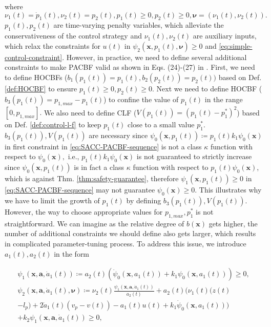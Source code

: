 where $\nu_{1}(t)=\dot{p}_{1}(t),\nu_{2}(t)=p_{2}(t), p_{1}(t)\ge0,p_{2}(t)\ge0,\boldsymbol{\nu}=(\nu_{1}(t),\nu_{2}(t)).$ $p_{1}(t),p_{2}(t)$ are time-varying penalty variables, which alleviate the conservativeness of the control strategy and $\nu_{1}(t),\nu_{2}(t)$ are auxiliary inputs, which relax the constraints for $u(t)$ in $\psi_{2}(\boldsymbol{x},p_{1}(t),\boldsymbol{\nu})\ge0$ and \eqref{eq:simple-control-constraint}. However, in practice, we need to define several additional constraints to make PACBF valid as shown in Eqs. (24)-(27) in \cite{xiao2021adaptive}. First, we need to define HOCBFs ($b_{1}(p_{1}(t))=p_{1}(t),b_{2}(p_{2}(t))=p_{2}(t))$ based on Def. \ref{def:HOCBF} to ensure $p_{1}(t)\ge0,p_{2}(t)\ge0.$ Next we need to define HOCBF ($b_{3}(p_{1}(t))=p_{1,max}-p_{1}(t)$) to confine the value of $p_{1}(t)$ in the range $[0,p_{1,max}].$ We also need to define CLF ($V(p_{1}(t))=(p_{1}(t)-p_{1}^{\ast})^{2}$) based on Def. \ref{def:control-l-f} to keep $p_{1}(t)$ close to a small value $p_{1}^{\ast}.$ $b_{3}(p_{1}(t)), V(p_{1}(t))$ are necessary since $\psi_{0}(\boldsymbol{x},p_{1}(t))\coloneqq p_{1}(t)k_{1}\psi_{0}(\boldsymbol{x})$ in first constraint in \eqref{eq:SACC-PACBF-sequence} is not a class $\kappa$ function with respect to $\psi_{0}(\boldsymbol{x}),$ i.e., $p_{1}(t)k_{1}\psi_{0}(\boldsymbol{x})$ is not guaranteed to strictly increase since $\psi_{0}(\boldsymbol{x},p_{1}(t))$ is in fact a class $\kappa$ function with respect to $p_{1}(t)\psi_{0}(\boldsymbol{x})$, which is against Thm. \ref{thm:safety-guarantee}, therefore $\psi_{1}(\boldsymbol{x},p_{1}(t))\ge 0$ in \eqref{eq:SACC-PACBF-sequence} may not guarantee $\psi_{0}(\boldsymbol{x})\ge 0.$ This illustrates why we have to limit the growth of $p_{1}(t)$ by defining $b_{3}(p_{1}(t)),V(p_{1}(t)).$ However, the way to choose appropriate values for $p_{1,max},p_{1}^{\ast}$ is not straightforward. We can imagine as the relative degree of $b(\boldsymbol{x})$ gets higher, the number of additional constraints we should define also gets larger, which results in complicated parameter-tuning process. To address this issue, we introduce $a_{1}(t),a_{2}(t)$ in the form
\begin{small}
\begin{equation}
\label{eq:SACC-AVBCBF-sequence}
\begin{split}
\psi_{1}(\boldsymbol{x},\boldsymbol{a},\dot{a}_{1}(t))\coloneqq a_{2}(t)(\dot{\psi}_{0}(\boldsymbol{x},a_{1}(t))
+k_{1}\psi_{0}(\boldsymbol{x},a_{1}(t)))\ge 0,\\
\psi_{2}(\boldsymbol{x},\boldsymbol{a},\dot{a}_{1}(t),\boldsymbol{\nu})\coloneqq \nu_{2}(t)\frac{\psi_{1}(\boldsymbol{x},\boldsymbol{a},\dot{a}_{1}(t))}{a_{2}(t)} +a_{2}(t)(\nu_{1}(t)(z(t)\\
-l_{p})+2\dot{a}_{1}(t)(v_{p}-v(t))-a_{1}(t)u(t)+k_{1}\dot{\psi}_{0}(\boldsymbol{x},a_{1}(t)))\\
+k_{2}\psi_{1}(\boldsymbol{x},\boldsymbol{a},\dot{a}_{1}(t))\ge 0, 
\end{split}
\end{equation}
\end{small}
